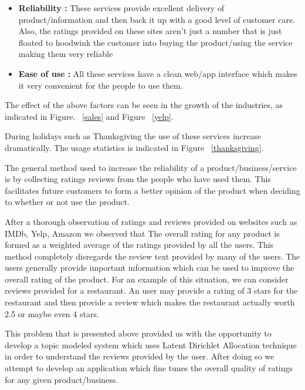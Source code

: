 \documentclass{article}
\begin{document}
	\begin{itemize}
		\item{\textbf{Reliability :} These services provide excellent delivery of product/information and then back it up with a 
		good level of customer care. Also, the ratings provided on these sites aren't just a number that is just floated 
		to hoodwink the customer into buying the product/using the service making them very reliable}
		\item{\textbf{Ease of use :} All these services have a clean web/app interface which makes it very convenient for the 
		people to use them. }
\end{itemize}
The effect of the above factors can be seen in the growth of the industries, as indicated in Figure. ~\ref{sales} and Figure ~\ref{yelp}.

During holidays such as Thanksgiving the use of these services increase dramatically. The usage statistics is indicated in Figure ~\ref{thanksgiving}.

The general method used to increase the reliability of a product/business/service is by collecting ratings reviews from the people who have used them. This facilitates future customers to form a better opinion of the product when deciding to whether or not use the product.  

After a thorough observation of ratings and reviews provided on websites such as IMDb, Yelp, Amazon we observed that The overall rating for any product is formed as a weighted average of the ratings provided by all the users. This method completely disregards the review text provided by many of the users.  The users generally provide important information which can be used to improve the overall rating of the product. For an example of this situation, we can consider reviews provided for a restaurant. An user may provide a rating of 3 stars for the restaurant and then provide a review which makes the restaurant actually worth 2.5 or maybe even 4 stars. 

This problem that is presented above provided us with the opportunity to develop a topic modeled system which uses Latent Dirichlet Allocation technique in order to understand the reviews provided by the user. After doing so we attempt to develop an application which fine tunes the overall quality of ratings for any given product/business. 
\end{document}
